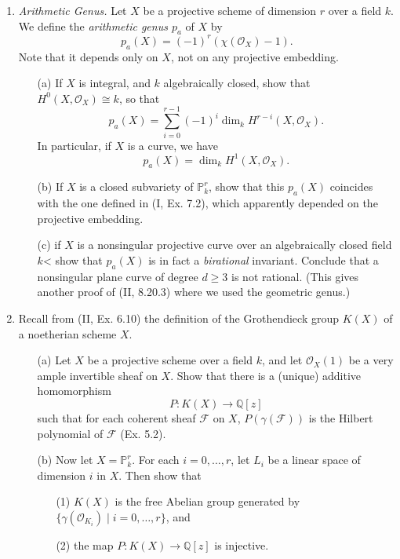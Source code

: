 \documentclass{article}
\newcommand{\fF}{\mathscr{F}}
\newcommand{\fO}{\mathscr{O}}
\newcommand{\PP}{\mathbb{P}}
\newcommand{\Q}{\mathbb{Q}}
\begin{document}
\begin{enumerate} [label=\textbf{\arabic*.}, leftmargin=0em]
\item \textit{Arithmetic Genus.} Let $X$ be a projective scheme of dimension $r$ over a field $k$. We define the \textit{arithmetic genus $p_a$} of $X$ by
\begin{equation*}
  p_a(X) = (-1)^r (\chi(\fO_X) - 1).
\end{equation*}
Note that it depends only on $X$, not on any projective embedding.
\begin{itemize}
  \item[(a)] If $X$ is integral, and $k$ algebraically closed, show that $H^0(X, \fO_X) \cong k$, so that
  \begin{equation*}
    p_a(X) = \sum_{i = 0}^{r - 1} (-1)^i \dim_k{H^{r-i}(X, \fO_X)}.
  \end{equation*}
  In particular, if $X$ is a curve, we have
  \begin{equation*}
    p_a(X) = \dim_k{H^1(X, \fO_X)}.
  \end{equation*}
  \item[(b)] If $X$ is a closed subvariety of $\PP_k^r$, show that this $p_a(X)$ coincides with the one defined in (I, Ex. 7.2), which apparently depended on the projective embedding.
  \item[(c)] if $X$ is a nonsingular projective curve over an algebraically closed field $k$< show that $p_a(X)$ is in fact a \textit{birational} invariant. Conclude that a nonsingular plane curve of degree $d \geq 3$ is not rational. (This gives another proof of (II, 8.20.3) where we used the geometric genus.)
\end{itemize}

\item Recall from (II, Ex. 6.10) the definition of the Grothendieck group $K(X)$ of a noetherian scheme $X$.
\begin{itemize}
  \item[(a)] Let $X$ be a projective scheme over a field $k$, and let $\fO_X(1)$ be a very ample invertible sheaf on $X$. Show that there is a (unique) additive homomorphism
  \begin{equation*}
    P : K(X) \to \Q[z]
  \end{equation*}
  such that for each coherent sheaf $\fF$ on $X$, $P(\gamma(\fF))$ is the Hilbert polynomial of $\fF$ (Ex. 5.2).
  \item[(b)] Now let $X = \PP_k^r$. For each $i = 0, \dots, r$, let $L_i$ be a linear space of dimension $i$ in $X$. Then show that
  \begin{itemize}
    \item[(1)] $K(X)$ is the free Abelian group generated by $\{ \gamma(\fO_{K_i}) \mid i = 0, \dots, r \}$, and
    \item[(2)] the map $P : K(X) \to \Q[z]$ is injective.
  \end{itemize}
\end{itemize}


\end{enumerate}
\end{document}
